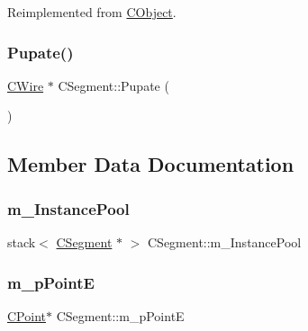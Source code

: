 Reimplemented from \mbox{\hyperlink{classCObject_a75afd905b2d14ed374c75d90f079a389}{C\+Object}}.

\mbox{\label{classCSegment_a4d20ce3a783a16edc3973fa80e09ea5f}} 
\subsubsection{\texorpdfstring{Pupate()}{Pupate()}}
{\footnotesize\ttfamily \mbox{\hyperlink{classCWire}{C\+Wire}} $\ast$ C\+Segment\+::\+Pupate (\begin{DoxyParamCaption}{ }\end{DoxyParamCaption})}



\subsection{Member Data Documentation}
\mbox{\label{classCSegment_aaa7f80d4e6346da4eafd833e552a291f}} 
\subsubsection{\texorpdfstring{m\_InstancePool}{m\_InstancePool}}
{\footnotesize\ttfamily stack$<$ \mbox{\hyperlink{classCSegment}{C\+Segment}} $\ast$ $>$ C\+Segment\+::m\+\_\+\+Instance\+Pool\hspace{0.3cm}{\ttfamily [static]}}

\mbox{\label{classCSegment_a5180095ea175f47e4cb88d21ad5928f9}} 
\subsubsection{\texorpdfstring{m\_pPointE}{m\_pPointE}}
{\footnotesize\ttfamily \mbox{\hyperlink{classCPoint}{C\+Point}}$\ast$ C\+Segment\+::m\+\_\+p\+PointE}

\mbox{\label{classCSegment_a832233537e6199058e184bbe09f10e05}} 
